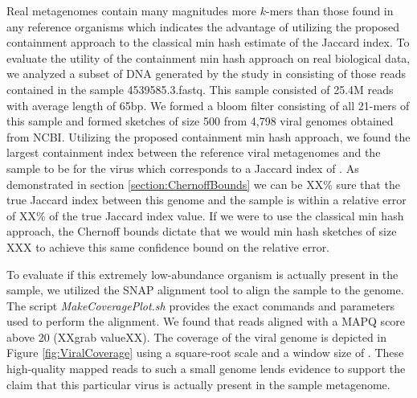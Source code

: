 \documentclass[11pt]{amsart}
\theoremstyle{remark}
\numberwithin{equation}{section}
\newcommand{\FoundOrganismContainment}{\protect }
\newcommand{\FoundOrganismJaccard}{\protect }
\newcommand{\FoundOrganismName}{\protect }
\newcommand{\NumReadsAligned}{\protect }
\newcommand{\WindowSize}{\protect }
\begin{document}
Real metagenomes contain many magnitudes more $k$-mers than those found in any reference organisms \cite{} which indicates the advantage of utilizing the proposed containment approach to the classical min hash estimate of the Jaccard index. To evaluate the utility of the containment min hash approach on real biological data, we analyzed a subset of DNA generated by the study in \cite{howe2014tackling} consisting of those reads contained in the sample 4539585.3.fastq. This sample consisted of 25.4M reads with average length of 65bp. We formed a bloom filter consisting of all 21-mers of this sample and formed sketches of size 500 from 4,798 viral genomes obtained from NCBI. Utilizing the proposed containment min hash approach, we found the largest containment index between the reference viral metagenomes and the sample to be \FoundOrganismContainment for the virus \textit{\FoundOrganismName}which corresponds to a Jaccard index of \FoundOrganismJaccard \unskip. As demonstrated in section \ref{section:ChernoffBounds} we can be XX\% sure that the true Jaccard index between this genome and the sample is within a relative error of XX\% of the true Jaccard index value.  If we were to use the classical min hash approach, the Chernoff bounds dictate that we would min hash sketches of size XXX to achieve this same confidence bound on the relative error.

To evaluate if this extremely low-abundance organism is actually present in the sample, we utilized the SNAP alignment tool \cite{zaharia2011faster} to align the sample to the \textit{\FoundOrganismName} genome. The script \textit{MakeCoveragePlot.sh} provides the exact commands and parameters used to perform the alignment. We found that \NumReadsAligned reads aligned with a MAPQ score above 20 (XXgrab valueXX). The coverage of the viral genome is depicted in Figure \ref{fig:ViralCoverage} using a square-root scale and a window size of \WindowSize\unskip. 
These high-quality mapped reads to such a small genome lends evidence to support the claim that this particular virus is actually present in the sample metagenome.
\end{document}
